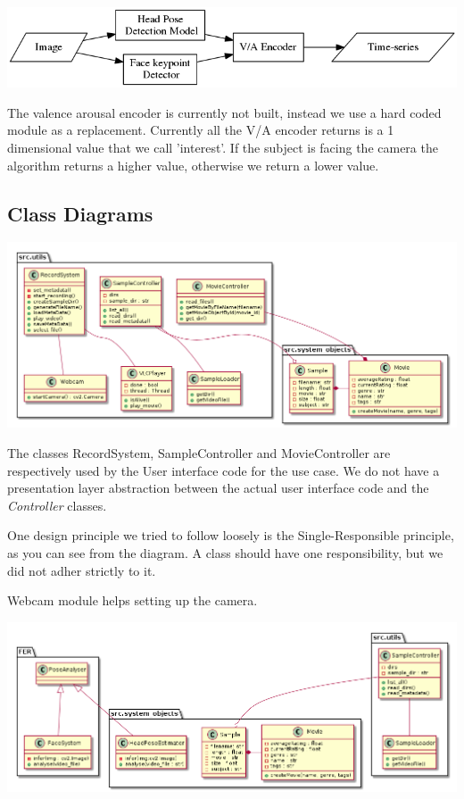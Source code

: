 \documentclass[12pt,a4paper,man]{report}
\begin{document}
\begin{center}
\includegraphics[width=.9\linewidth]{img/begrpipeline.png}
\end{center}

The valence arousal encoder is currently not built, instead we use a hard coded module as a replacement. Currently all the V/A encoder returns is a 1 dimensional value that we call 'interest'. If the subject is facing the camera the algorithm returns a higher value, otherwise we return a lower value.


\subsection{Class Diagrams}
\label{sec:org9fb84cb}

\begin{center}
\includegraphics[width=.9\linewidth]{img/class1.png}
\end{center}

The classes RecordSystem, SampleController and MovieController are respectively used by the User interface code for the use case. We do not have a presentation layer abstraction between the actual user interface code and the \emph{Controller} classes.

One design principle we tried to follow loosely is the Single-Responsible principle, as you can see from the diagram. A class should have one responsibility, but we did not adher strictly to it.

Webcam module helps setting up the camera.


\begin{center}
\includegraphics[width=.9\linewidth]{img/class2.png}
\end{center}
\end{document}
